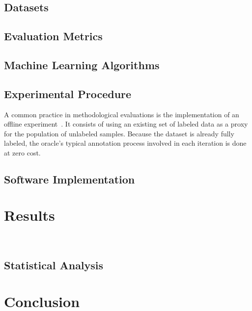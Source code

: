 \documentclass[parskip=full]{scrartcl}
\begin{document}
\subsection{Datasets}

\subsection{Evaluation Metrics}

\subsection{Machine Learning Algorithms}

\subsection{Experimental Procedure}

A common practice in methodological evaluations is the implementation of an offline
experiment~\cite{Kagy2019}. It consists of using an existing set of labeled data as a proxy for the
population of unlabeled samples. Because the dataset is already fully labeled, the oracle's typical
annotation process involved in each iteration is done at zero cost.



\subsection{Software Implementation}

\section{Results}~\label{sec:results}

\subsection{Statistical Analysis}

\section{Conclusion}~\label{sec:conclusion}



\end{document}
